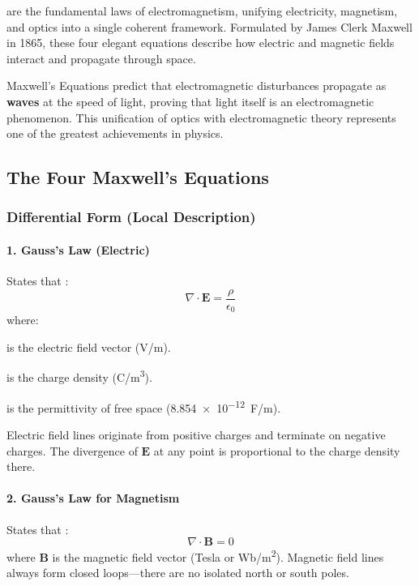 are the fundamental laws of electromagnetism, unifying electricity, magnetism, and optics into a single coherent framework. Formulated by James Clerk Maxwell in 1865, these four elegant equations describe how electric and magnetic fields interact and propagate through space.

\begin{keyconcept}
    Maxwell's Equations predict that electromagnetic disturbances propagate as \textbf{waves} at the speed of light, proving that light itself is an electromagnetic phenomenon. This unification of optics with electromagnetic theory represents one of the greatest achievements in physics.
\end{keyconcept}

\subsection{The Four Maxwell's Equations}

\subsubsection{Differential Form (Local Description)}

\paragraph{1. Gauss's Law (Electric)}
States that :
\begin{equation}
    \nabla \cdot \mathbf{E} = \frac{\rho}{\epsilon_0}
    \label{eq:gauss-electric}
\end{equation}
where:
\begin{description}[\dinfont, style=unboxed, labelwidth=1.5cm]
    \item[$\mathbf{E}$] is the electric field vector (\unit{V/m}).
    \item[$\rho$] is the charge density (\unit{C/m^3}).
    \item[$\epsilon_0$] is the permittivity of free space (\SI{8.854e-12}{F/m}).
\end{description}
 Electric field lines originate from positive charges and terminate on negative charges. The divergence of $\mathbf{E}$ at any point is proportional to the charge density there.

\paragraph{2. Gauss's Law for Magnetism}
States that :
\begin{equation}
    \nabla \cdot \mathbf{B} = 0
    \label{eq:gauss-magnetic}
\end{equation}
where $\mathbf{B}$ is the magnetic field vector (Tesla or \unit{Wb/m^2}).
 Magnetic field lines always form closed loops---there are no isolated north or south poles.

